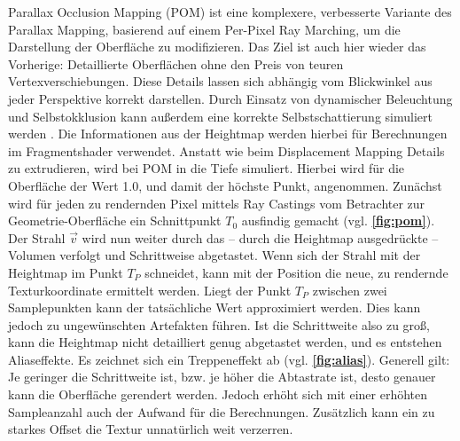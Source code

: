 Parallax Occlusion Mapping (POM) ist eine komplexere, verbesserte Variante des Parallax Mapping, basierend auf einem Per-Pixel Ray Marching, um die 
Darstellung der Oberfläche zu modifizieren.
Das Ziel ist auch hier wieder das Vorherige: Detaillierte Oberflächen ohne den Preis von teuren Vertexverschiebungen.
Diese Details lassen sich abhängig vom Blickwinkel aus jeder Perspektive korrekt darstellen.
Durch Einsatz von dynamischer Beleuchtung und Selbstokklusion kann außerdem eine korrekte Selbstschattierung simuliert werden \parencite{Brawley2004, Tatarchuk2006}.
Die Informationen aus der Heightmap werden hierbei für Berechnungen im Fragmentshader verwendet.
Anstatt wie beim Displacement Mapping Details zu extrudieren, wird bei POM in die Tiefe simuliert.
Hierbei wird für die Oberfläche der Wert 1.0, und damit der höchste Punkt, angenommen.
Zunächst wird für jeden zu rendernden Pixel mittels Ray Castings vom Betrachter zur Geometrie-Oberfläche ein Schnittpunkt  $T_0$ ausfindig gemacht 
(vgl. \textbf{\autoref{fig:pom}}).
Der Strahl $\vec{v}$ wird nun weiter durch das – durch die Heightmap ausgedrückte – Volumen verfolgt und Schrittweise abgetastet. Wenn sich der Strahl 
mit der Heightmap im Punkt $T_P$ schneidet, kann mit der Position die neue, zu rendernde Texturkoordinate ermittelt werden. Liegt der Punkt $T_P$ zwischen 
zwei Samplepunkten kann der tatsächliche Wert approximiert werden. Dies kann jedoch zu ungewünschten Artefakten führen.
Ist die Schrittweite also zu groß, kann die Heightmap nicht detailliert genug abgetastet werden, und es entstehen Aliaseffekte. Es zeichnet sich
ein Treppeneffekt ab (vgl. \textbf{\autoref{fig:alias}}). Generell gilt: Je geringer die Schrittweite ist, bzw. je höher die Abtastrate ist, 
desto genauer kann die Oberfläche gerendert werden. Jedoch erhöht sich mit einer erhöhten Sampleanzahl auch der Aufwand für die Berechnungen.
Zusätzlich kann ein zu starkes Offset die Textur unnatürlich weit verzerren. 


